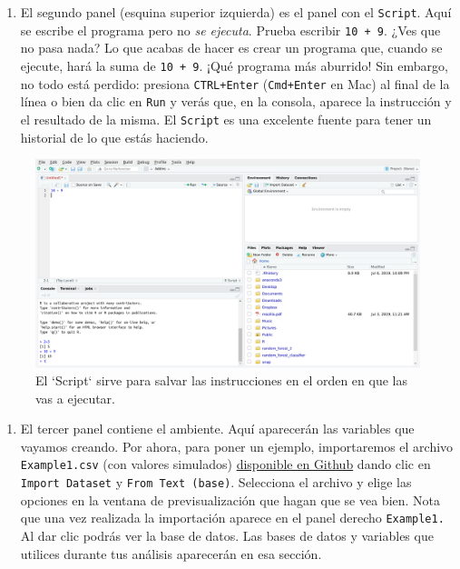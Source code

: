 \documentclass[
]{book}
\providecommand{\tightlist}{%
  \setlength{\itemsep}{0pt}\setlength{\parskip}{0pt}}
\begin{document}
\begin{enumerate}
\def\labelenumi{\arabic{enumi}.}
\setcounter{enumi}{1}
\tightlist
\item
  El segundo panel (esquina superior izquierda) es el panel con el \texttt{Script}. Aquí se escribe el programa pero no \emph{se ejecuta}. Prueba escribir \texttt{10\ +\ 9}. ¿Ves que no pasa nada? Lo que acabas de hacer es crear un programa que, cuando se ejecute, hará la suma de \texttt{10\ +\ 9}. ¡Qué programa más aburrido! Sin embargo, no todo está perdido: presiona \texttt{CTRL+Enter} (\texttt{Cmd+Enter} en Mac) al final de la línea o bien da clic en \texttt{Run} y verás que, en la consola, aparece la instrucción y el resultado de la misma. El \texttt{Script} es una excelente fuente para tener un historial de lo que estás haciendo.
\end{enumerate}

\begin{figure}

{\centering \includegraphics[width=40in]{images/RStudio5} 

}

\caption{El `Script` sirve para salvar las instrucciones en el orden en que las vas a ejecutar.}\label{fig:unnamed-chunk-29}
\end{figure}

\begin{enumerate}
\def\labelenumi{\arabic{enumi}.}
\setcounter{enumi}{2}
\tightlist
\item
  El tercer panel contiene el ambiente. Aquí aparecerán las variables que vayamos creando. Por ahora, para poner un ejemplo, importaremos el archivo \texttt{Example1.csv} (con valores simulados) \href{https://github.com/RodrigoZepeda/LibroEstadistica/tree/master/datasets}{disponible en Github} dando clic en \texttt{Import\ Dataset} y \texttt{From\ Text\ (base)}. Selecciona el archivo y elige las opciones en la ventana de previsualización que hagan que se vea bien. Nota que una vez realizada la importación aparece en el panel derecho \texttt{Example1.} Al dar clic podrás ver la base de datos. Las bases de datos y variables que utilices durante tus análisis aparecerán en esa sección.
\end{enumerate}
\end{document}
